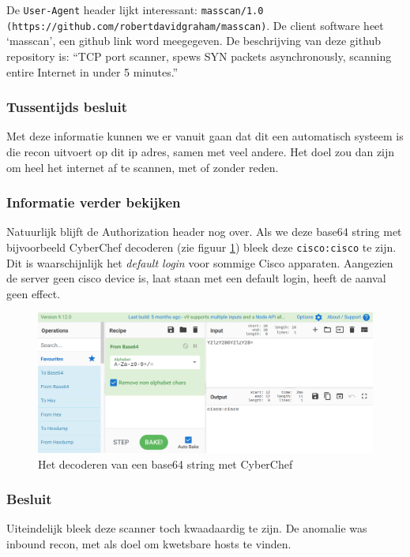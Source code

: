 \documentclass[a4paper, 12pt]{report}
\begin{document}
De \lstinline|User-Agent| header lijkt interessant: \lstinline|masscan/1.0 (https://github.com/robertdavidgraham/masscan)|.
De client software heet `masscan', een github link word meegegeven.
De beschrijving van deze github repository is: ``TCP port scanner, spews SYN packets asynchronously, scanning entire Internet in under 5 minutes.''

\subsubsection{Tussentijds besluit}
Met deze informatie kunnen we er vanuit gaan dat dit een automatisch systeem is die recon uitvoert op dit ip adres, samen met veel andere.
Het doel zou dan zijn om heel het internet af te scannen, met of zonder reden.

\subsubsection{Informatie verder bekijken}
Natuurlijk blijft de Authorization header nog over.
Als we deze base64 string met bijvoorbeeld CyberChef decoderen (zie figuur \ref{fig:analyse-masscan-cyberchef}) bleek deze \lstinline|cisco:cisco| te zijn.
Dit is waarschijnlijk het \emph{default login} voor sommige Cisco apparaten.
Aangezien de server geen cisco device is, laat staan met een default login, heeft de aanval geen effect.

\begin{figure}[H]
  \centering
  \includegraphics[width=\textwidth]{analyse-masscan-cyberchef}
  \caption{Het decoderen van een base64 string met CyberChef}
  \label{fig:analyse-masscan-cyberchef}
\end{figure}

\subsubsection{Besluit}
Uiteindelijk bleek deze scanner toch kwaadaardig te zijn.
De anomalie was inbound recon, met als doel om kwetsbare hosts te vinden.
\end{document}
